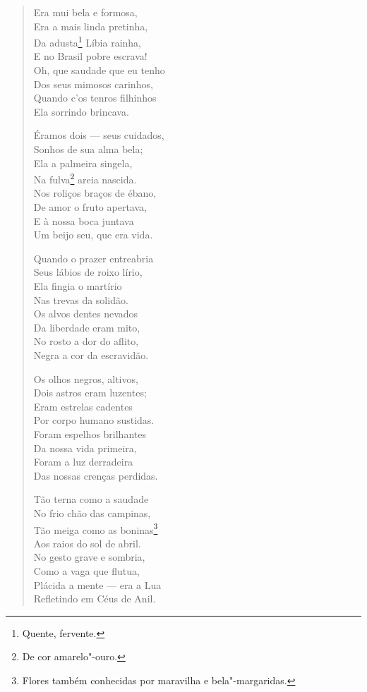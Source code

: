 \begin{verse}
Era mui bela e formosa,\\
Era a mais linda pretinha,\\
Da adusta\footnote{Quente, fervente.} Líbia rainha,\\
E no Brasil pobre escrava!\\
Oh, que saudade que eu tenho\\
Dos seus mimosos carinhos,\\
Quando c'os tenros filhinhos\\
Ela sorrindo brincava.

Éramos dois --- seus cuidados,\\
Sonhos de sua alma bela;\\
Ela a palmeira singela,\\
Na fulva\footnote{De cor amarelo"-ouro.} areia nascida.\\
Nos roliços braços de ébano,\\
De amor o fruto apertava,\\
E à nossa boca juntava\\
Um beijo seu, que era vida.

Quando o prazer entreabria\\
Seus lábios de roixo lírio,\\
Ela fingia o martírio\\
Nas trevas da solidão.\\
Os alvos dentes nevados\\
Da liberdade eram mito,\\
No rosto a dor do aflito,\\
Negra a cor da escravidão.

Os olhos negros, altivos,\\
Dois astros eram luzentes;\\
Eram estrelas cadentes\\
Por corpo humano sustidas.\\
Foram espelhos brilhantes\\
Da nossa vida primeira,\\
Foram a luz derradeira\\
Das nossas crenças perdidas.

Tão terna como a saudade\\
No frio chão das campinas,\\
Tão meiga como as boninas\footnote{Flores também conhecidas por maravilha e bela"-margaridas.}\\
Aos raios do sol de abril.\\
No gesto grave e sombria,\\
Como a vaga que flutua,\\
Plácida a mente --- era a Lua\\
Refletindo em Céus de Anil.


\end{verse}
